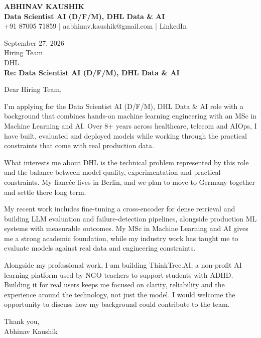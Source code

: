 \documentclass[10pt,a4paper]{article}
\begin{document}
\begin{center}
{\Large\bfseries ABHINAV KAUSHIK}\\[2pt]
{\bfseries Data Scientist AI (D/F/M), DHL Data \& AI}\\[2pt]
+91 87005 71859 \quad | \quad aabhinav.kaushik@gmail.com \quad | \quad LinkedIn
\end{center}
\vspace{8pt}
September 27, 2026\\[6pt]
Hiring Team\\
DHL\\[4pt]
\textbf{Re: Data Scientist AI (D/F/M), DHL Data \& AI}

Dear Hiring Team,

I’m applying for the Data Scientist AI (D/F/M), DHL Data \& AI role with a background that combines hands-on machine learning engineering with an MSc in Machine Learning and AI. Over 8+ years across healthcare, telecom and AIOps, I have built, evaluated and deployed models while working through the practical constraints that come with real production data.

What interests me about DHL is the technical problem represented by this role and the balance between model quality, experimentation and practical constraints. My fiancée lives in Berlin, and we plan to move to Germany together and settle there long term.

My recent work includes fine-tuning a cross-encoder for dense retrieval and building LLM evaluation and failure-detection pipelines, alongside production ML systems with measurable outcomes. My MSc in Machine Learning and AI gives me a strong academic foundation, while my industry work has taught me to evaluate models against real data and engineering constraints.

Alongside my professional work, I am building ThinkTree.AI, a non-profit AI learning platform used by NGO teachers to support students with ADHD. Building it for real users keeps me focused on clarity, reliability and the experience around the technology, not just the model. I would welcome the opportunity to discuss how my background could contribute to the team.

Thank you,\\
Abhinav Kaushik
\end{document}
